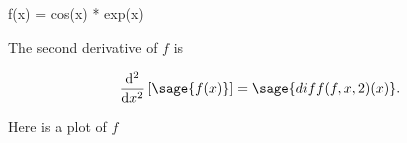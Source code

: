 \documentclass{article}
\begin{document}
\begin{sageblock}
  f(x) = cos(x) * exp(x)
\end{sageblock}

The second derivative of $f$ is

\[
  \frac{\mathrm{d}^{2}}{\mathrm{d}x^{2}} \left[ \sage{f(x)} \right] =
  \sage{diff(f, x, 2)(x)}.
\]

Here is a plot of $f$

\end{document}
